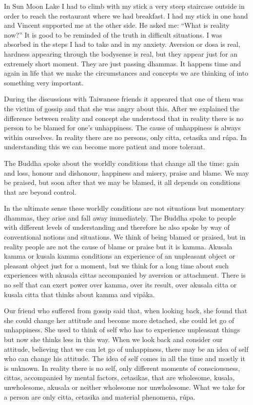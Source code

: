 \documentclass[10pt,a4paper,final]{article}
\begin{document}
In Sun Moon Lake I had to climb with my stick a very steep
staircase outside in order to reach the restaurant where we had
breakfast. I had my stick in one hand and Vincent supported me at the
other side. He asked me: ``What is reality now?'' It is good to be
reminded of the truth in difficult situations. I was absorbed in the
steps I had to take and in my anxiety. Aversion or dosa is real,
hardness appearing through the bodysense is real, but they appear just
for an extremely short moment. They are just passing dhammas. It happens
time and again in life that we make the circumstances and concepts we
are thinking of into something very important. 

During the discussions with Taiwanese friends it appeared
that one of them was the victim of gossip and that she was angry about
this. After we explained the difference between reality and concept she
understood that in reality there is no person to be blamed for one's
unhappiness. The cause of unhappiness is always within ourselves. In
reality there are no persons, only citta, cetasika and rúpa. In
understanding this we can become more patient and more tolerant. 

The Buddha spoke about the worldly conditions that change all
the time: gain and loss, honour and dishonour, happiness and misery,
praise and blame. We may be praised, but soon after that we may be
blamed, it all depends on conditions that are beyond control. 

In the ultimate sense these worldly conditions are not
situations but momentary dhammas, they arise and fall away immediately.
The Buddha spoke to people with different levels of understanding and
therefore he also spoke by way of conventional notions and situations.
We think of being blamed or praised, but in reality people are not the
cause of blame or praise but it is kamma. Akusala kamma or kusala kamma
conditions an experience of an unpleasant object or pleasant object just
for a moment, but we think for a long time about such experiences with
akusala cittas accompanied by aversion or attachment. There is no self
that can exert power over kamma, over its result, over akusala citta or
kusala citta that thinks about kamma and vipåka.

Our friend who suffered from gossip said that, when looking
back, she found that she could change her attitude and become more
detached, she could let go of unhappiness. She used to think of self who
has to experience unpleasant things but now she thinks less in this way.
When we look back and consider our attitude, believing that we can let
go of unhappiness, there may be an idea of self who can change his
attitude. The idea of self comes in all the time and mostly it is
unknown. In reality there is no self, only different moments of
consciousness, cittas, accompanied by mental factors, cetasikas, that
are wholesome, kusala, unwholesome, akusala or neither wholesome nor
unwholesome. What we take for a person are only citta, cetasika and
material phenomena, rúpa. 
\end{document}
